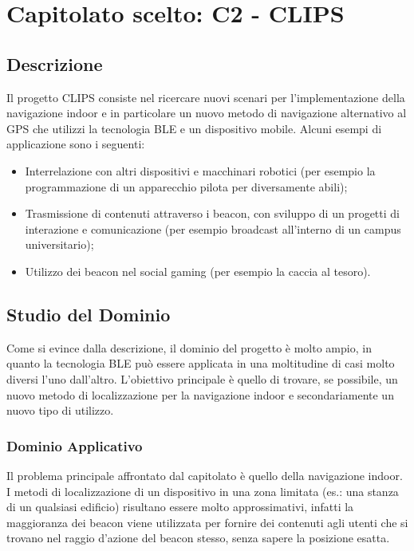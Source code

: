 \section{Capitolato scelto: C2 - CLIPS}

\subsection{Descrizione}

Il progetto CLIPS consiste nel ricercare nuovi scenari per l'implementazione della navigazione indoor e in particolare 
un nuovo metodo di navigazione alternativo al GPS che utilizzi la tecnologia BLE e un dispositivo mobile.
Alcuni esempi di applicazione sono i seguenti:
\begin{itemize}
	\item Interrelazione con altri dispositivi e macchinari robotici (per esempio la programmazione di un apparecchio pilota per diversamente abili);
	\item Trasmissione di contenuti attraverso i beacon, con sviluppo di un progetti di interazione e comunicazione (per esempio broadcast all'interno di un campus universitario);
	\item Utilizzo dei beacon nel social gaming (per esempio la caccia al tesoro).
\end{itemize}

\subsection{Studio del Dominio}

Come si evince dalla descrizione, il dominio del progetto è molto ampio, in quanto la tecnologia BLE può essere applicata in una moltitudine
di casi molto diversi l'uno dall'altro. L'obiettivo principale è quello di trovare, se possibile, un nuovo metodo di localizzazione per la navigazione indoor e secondariamente
un nuovo tipo di utilizzo.


\subsubsection{Dominio Applicativo}
Il problema principale affrontato dal capitolato è quello della navigazione indoor. I metodi di localizzazione di un dispositivo in una zona limitata (es.: una stanza di un qualsiasi edificio)
risultano essere molto approssimativi, infatti la maggioranza dei beacon viene utilizzata per fornire dei contenuti agli utenti che si trovano nel raggio d'azione del beacon stesso, senza sapere 
la posizione esatta.

